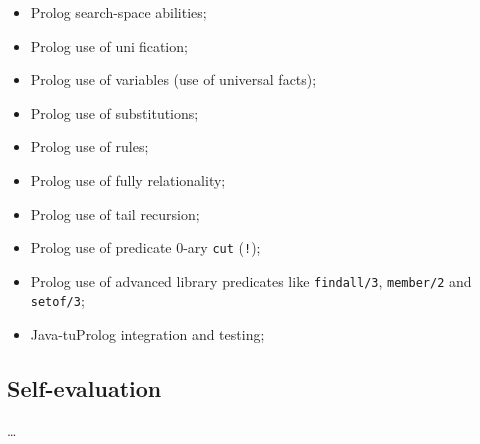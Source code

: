         \begin{itemize}
            \item Prolog search-space abilities;
            \item Prolog use of unification;
            \item Prolog use of variables (use of universal facts);
            \item Prolog use of substitutions;
            \item Prolog use of rules;
            \item Prolog use of fully relationality;
            \item Prolog use of tail recursion;
            \item Prolog use of predicate 0-ary \texttt{cut} (\texttt{!});
            \item Prolog use of advanced library predicates like \texttt{findall/3}, \texttt{member/2} and \texttt{setof/3};
            \item Java-tuProlog integration and testing;
        \end{itemize}

    \subsection*{Self-evaluation}

        \ldots %
 

    
    
